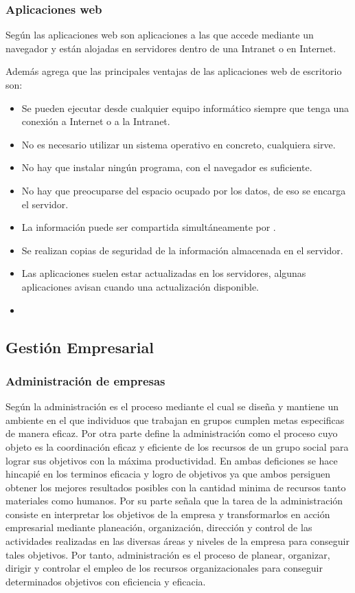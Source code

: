 \subsubsection{Aplicaciones web}
Según \cite{nino} las aplicaciones web son aplicaciones a las que accede mediante un
navegador y están alojadas en servidores dentro de una Intranet o en Internet.

Además \cite{nino} agrega que las principales ventajas de las aplicaciones web de
escritorio son:
\begin{itemize}
    \item Se pueden ejecutar desde cualquier equipo informático siempre que tenga
          una conexión a Internet o a la Intranet.
    \item No es necesario utilizar un sistema operativo en concreto, cualquiera sirve.
    \item No hay que instalar ningún programa, con el navegador es suficiente.
    \item No hay que preocuparse del espacio ocupado por los datos, de eso se encarga
          el servidor.
    \item La información puede ser compartida simultáneamente por .
    \item Se realizan copias de seguridad de la información almacenada en el servidor.
    \item Las aplicaciones suelen estar actualizadas en los servidores, algunas
          aplicaciones avisan cuando una actualización disponible.
    \item
\end{itemize}

\subsection{Gestión Empresarial}
\subsubsection{Administración de empresas}
Según \cite{koontz} la administración es el proceso mediante el cual se diseña
y mantiene un ambiente en el que individuos que trabajan en grupos cumplen metas
especificas de manera eficaz. Por otra parte \citep{galindo} define la administración
como el proceso cuyo objeto es la coordinación eficaz y eficiente de los recursos
de un grupo social para lograr sus objetivos con la máxima productividad.
En ambas deficiones se hace hincapié en los terminos eficacia y logro de objetivos
ya que ambos persiguen obtener los mejores resultados posibles con la cantidad
minima de recursos tanto materiales como humanos. Por su parte \citep{chiavenato}
señala que la tarea de la administración consiste en interpretar los objetivos
de la empresa y transformarlos en acción empresarial mediante planeación, organización,
dirección y control de las actividades realizadas en las diversas áreas y niveles
de la empresa para conseguir tales objetivos. Por tanto, administración es el
proceso de planear, organizar, dirigir y controlar el empleo de los recursos
organizacionales para conseguir determinados objetivos con eficiencia y eficacia.

